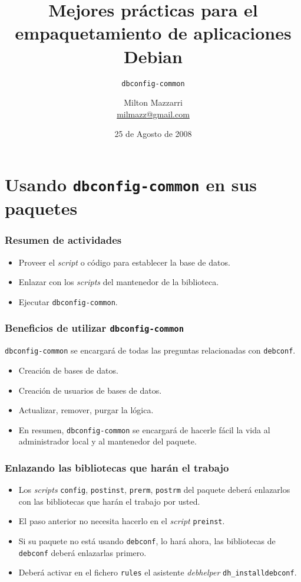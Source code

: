 \documentclass{beamer}
\title[\texttt{dbconfig-common}]{Mejores prácticas para el \\
empaquetamiento de aplicaciones Debian}
\subtitle{\texttt{dbconfig-common}}
\author[Milton Mazzarri]{Milton Mazzarri \\
\href{mailto:milmazz@gmail.com}{milmazz@gmail.com}
}
\institute[PDVSA]{Petróleos de Venezuela, S.A.}
\date{25 de Agosto de 2008}
\begin{document}
\begin{frame}[plain,label=intro]
\titlepage
\end{frame}

\section{Usando \texttt{dbconfig-common} en sus paquetes}

\frame
{
  \frametitle{Resumen de actividades}

  \begin{itemize}
    \item
      Proveer el \emph{script} o código para establecer la base de datos.
    \item
      Enlazar con los \emph{scripts} del mantenedor de la biblioteca.
    \item
      Ejecutar \texttt{dbconfig-common}.
  \end{itemize}
}

\frame
{
	\frametitle{Beneficios de utilizar \texttt{dbconfig-common}}

    \texttt{dbconfig-common} se encargará de todas las preguntas relacionadas
    con \texttt{debconf}.

  \begin{itemize}
    \item
      Creación de bases de datos.
    \item
      Creación de usuarios de bases de datos.
    \item
      Actualizar, remover, purgar la lógica.
    \item
      En resumen, \texttt{dbconfig-common} se encargará de hacerle fácil la
      vida al administrador local y al mantenedor del paquete.
  \end{itemize}
}

\frame
{
  \frametitle{Enlazando las bibliotecas que harán el trabajo}

  \begin{itemize}
    \item
      Los \emph{scripts} \texttt{config}, \texttt{postinst}, \texttt{prerm},
      \texttt{postrm} del paquete deberá enlazarlos con las bibliotecas que
      harán el trabajo por usted.
    \item
      El paso anterior no necesita hacerlo en el \emph{script}
      \texttt{preinst}.
    \item
      Si su paquete no está usando \texttt{debconf}, lo hará ahora, las
      bibliotecas de \texttt{debconf} deberá enlazarlas primero.
    \item
      Deberá activar en el fichero \texttt{rules} el asistente \emph{debhelper}
      \texttt{dh\_installdebconf}.
  \end{itemize}
}
\end{document}
